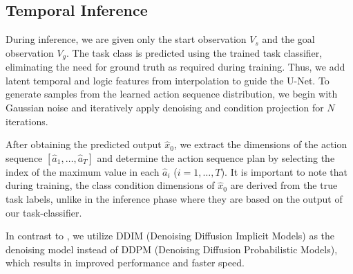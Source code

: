 \subsection{Temporal Inference}
During inference, we are given only the start observation $V_s$ and the goal observation $V_g$. The task class is predicted using the trained task classifier, eliminating the need for ground truth as required during training. Thus, we add latent temporal and logic features from interpolation to guide the U-Net. To generate samples from the learned action sequence distribution, we begin with Gaussian noise and iteratively apply denoising and condition projection for $N$ iterations.

After obtaining the predicted output $\hat{x}_0$, we extract the dimensions of the action sequence $[\hat{a}_1, \ldots, \hat{a}_T]$ and determine the action sequence plan by selecting the index of the maximum value in each $\hat{a}_i$ ($i = 1, \ldots, T$). It is important to note that during training, the class condition dimensions of $\hat{x}_0$ are derived from the true task labels, unlike in the inference phase where they are based on the output of our task-classifier.

In contrast to \citet{wang2023pdpp}, we utilize DDIM (Denoising Diffusion Implicit Models) as the denoising model instead of DDPM (Denoising Diffusion Probabilistic Models), which results in improved performance and faster speed.

\begin{comment}
\begin{algorithm}[t]
    \caption{Training}
    \begin{algorithmic}[1]
        \Require Initial input $x_0$, total diffusion steps number $N$, model $f_\theta$, $\{\overline{\alpha}_n\}_{n=1}^{N}$, Gt task class $c$
        \State $a_0^m=a_0[0,0,1...0,1]$($a$ in the steps related to $c$ takes the value `1', otherwise takes the value `0'$)$
        \Repeat
        \State $n \sim Uniform(\{1,...,N\})$
        \State $\epsilon \sim \mathcal{N}(0, I)$
        \State $x_n^m = \sqrt{\overline{\alpha}_n}x_0^m + \sqrt{1 - \overline{\alpha}_n}\epsilon$
        \State $\hat{x}_0^m = f_\theta(Proj(x_n^m), n)$
        \State Take gradient descent step on
        \State \quad $\bigtriangledown_\theta \left |\left | \left (x_0 - Proj(\hat{x}_0) \right ) * w_t * m_{b,t,i}\right | \right |^2$
        \Until converged
        
    \end{algorithmic}
    \label{train_alg}
\end{algorithm}
\end{comment}
